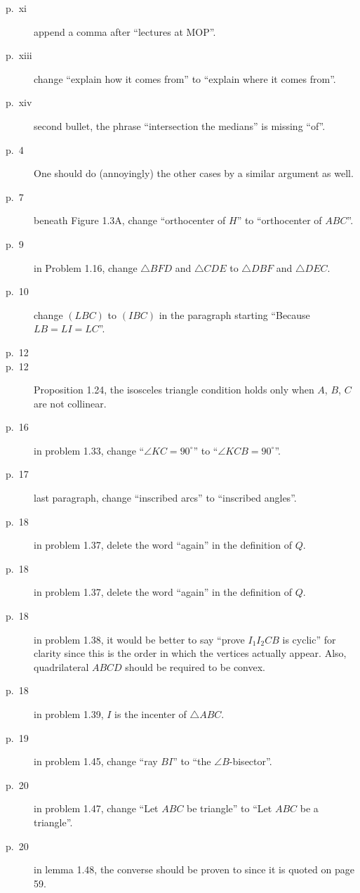 \documentclass[11pt]{scrartcl}
\begin{document}
\begin{description}

\item[p.\  xi] append a comma after ``lectures at MOP''.
\item[p.\  xiii] change ``explain how it comes from'' to ``explain where it comes from''.
\item[p.\  xiv] second bullet, the phrase ``intersection the medians'' is missing ``of''.
\item[p.\   4] 
  One should do (annoyingly) the other cases by a similar argument as well.
\item[p.\   7] beneath Figure 1.3A, change ``orthocenter of $H$'' to ``orthocenter of $ABC$''.
\item[p.\   9] in Problem 1.16, change $\triangle BFD$ and $\triangle CDE$
  to $\triangle DBF$ and $\triangle DEC$.
\item[p.\  10] change $(LBC)$ to $(IBC)$ in the paragraph starting ``Because $LB=LI=LC$''.
\item[p.\  12] 
\item[p.\  12] Proposition 1.24, the isosceles triangle condition holds
  only when $A$, $B$, $C$ are not collinear.
\item[p.\  16] in problem 1.33, change ``$\angle KC=90^{\circ}$'' to ``$\angle KCB=90^{\circ}$''.
\item[p.\  17] last paragraph, change ``inscribed arcs'' to ``inscribed angles''.
\item[p.\  18] in problem 1.37, delete the word ``again'' in the definition of $Q$.
\item[p.\  18] in problem 1.37, delete the word ``again'' in the definition of $Q$.
\item[p.\  18] in problem 1.38, it would be better to say
  ``prove $I_1 I_2 C B$ is cyclic'' for clarity
  since this is the order in which the vertices actually appear.
  Also, quadrilateral $ABCD$ should be required to be convex.
\item[p.\  18] in problem 1.39, $I$ is the incenter of $\triangle ABC$.
\item[p.\  19] in problem 1.45, change ``ray $BI$'' to ``the $\angle B$-bisector''.
\item[p.\  20] in problem 1.47, change ``Let $ABC$ be triangle'' to ``Let $ABC$ be a triangle''.
\item[p.\  20] in lemma 1.48, the converse should be proven to since it is quoted on page 59.

\end{description}
\end{document}

